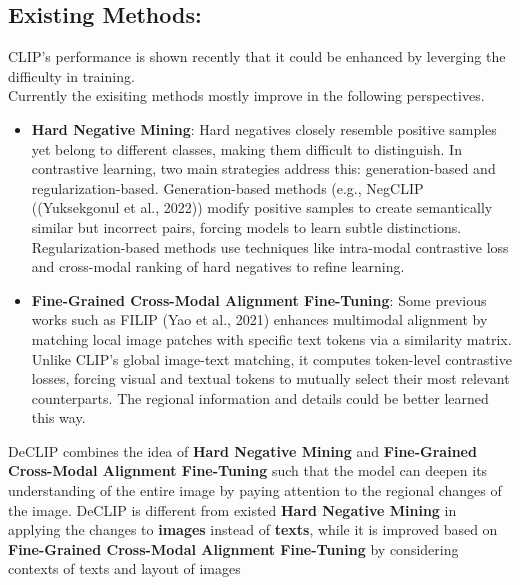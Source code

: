 \documentclass[11pt,letterpaper]{article}
\begin{document}
\subsection{Existing Methods:}
 CLIP's performance is shown recently that it could be enhanced by leverging the difficulty in training.\\
Currently the exisiting methods mostly improve in the following perspectives.\\
\begin{itemize}

    \item \textbf{Hard Negative Mining}: Hard negatives closely resemble positive samples yet belong to different classes, making them difficult to distinguish. In contrastive learning, two main strategies address this: generation-based and regularization-based. Generation-based methods (e.g., NegCLIP\cite{yuksekgonul2023visionlanguagemodelsbehavelike} ((Yuksekgonul et al., 2022)) modify positive samples to create semantically similar but incorrect pairs, forcing models to learn subtle distinctions. Regularization-based methods use techniques like intra-modal contrastive loss and cross-modal ranking of hard negatives to refine learning.

    
    
    \item \textbf{Fine-Grained Cross-Modal Alignment Fine-Tuning}: Some previous works such as FILIP\cite{yao2021filipfinegrainedinteractivelanguageimage} (Yao et al., 2021) enhances multimodal alignment by matching local image patches with specific text tokens via a similarity matrix. Unlike CLIP’s global image-text matching, it computes token-level contrastive losses, forcing visual and textual tokens to mutually select their most relevant counterparts. The regional information and details could be better learned this way.
\end{itemize}
DeCLIP combines the idea of \textbf{Hard Negative Mining} and \textbf{Fine-Grained Cross-Modal Alignment Fine-Tuning} such that the model can deepen its understanding of the entire image by paying attention to the regional changes of the image. DeCLIP is different from existed \textbf{Hard Negative Mining} in applying the changes to \textbf{images} instead of \textbf{texts}, while it is improved based on \textbf{Fine-Grained Cross-Modal Alignment Fine-Tuning} by considering contexts of texts and layout of images
\end{document}
